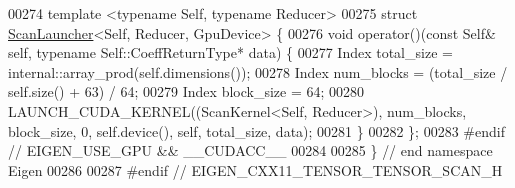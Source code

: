 \begin{DoxyCode}
00274 \textcolor{keyword}{template} <\textcolor{keyword}{typename} Self, \textcolor{keyword}{typename} Reducer>
00275 \textcolor{keyword}{struct }\hyperlink{struct_eigen_1_1_scan_launcher}{ScanLauncher}<Self, Reducer, GpuDevice> \{
00276   \textcolor{keywordtype}{void} operator()(\textcolor{keyword}{const} Self& \textcolor{keyword}{self}, \textcolor{keyword}{typename} Self::CoeffReturnType* data) \{
00277      Index total\_size = internal::array\_prod(\textcolor{keyword}{self}.dimensions());
00278      Index num\_blocks = (total\_size / \textcolor{keyword}{self}.size() + 63) / 64;
00279      Index block\_size = 64;
00280      LAUNCH\_CUDA\_KERNEL((ScanKernel<Self, Reducer>), num\_blocks, block\_size, 0, \textcolor{keyword}{self}.device(), \textcolor{keyword}{self}, 
      total\_size, data);
00281   \}
00282 \};
00283 \textcolor{preprocessor}{#endif  // EIGEN\_USE\_GPU && \_\_CUDACC\_\_}
00284 
00285 \}  \textcolor{comment}{// end namespace Eigen}
00286 
00287 \textcolor{preprocessor}{#endif  // EIGEN\_CXX11\_TENSOR\_TENSOR\_SCAN\_H}
\end{DoxyCode}
